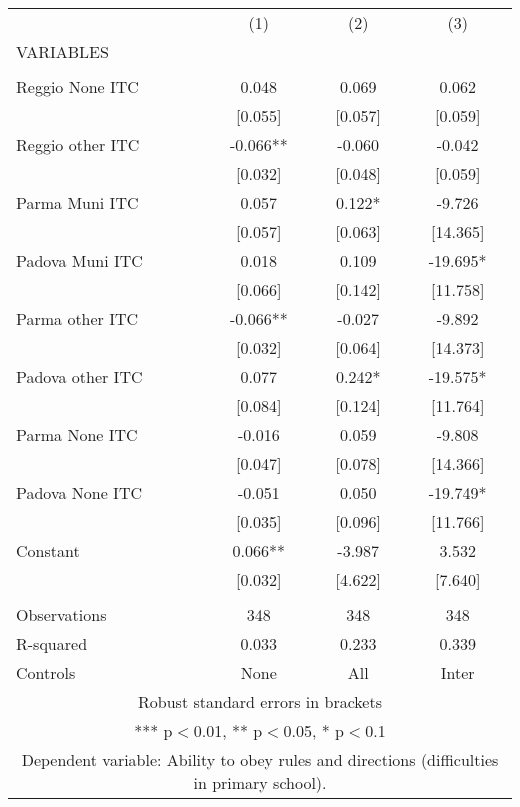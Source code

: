 \begin{tabular}{lccc} \hline
 & (1) & (2) & (3) \\
VARIABLES &  &  &  \\ \hline
 &  &  &  \\
Reggio None ITC & 0.048 & 0.069 & 0.062 \\
 & [0.055] & [0.057] & [0.059] \\
Reggio other ITC & -0.066** & -0.060 & -0.042 \\
 & [0.032] & [0.048] & [0.059] \\
Parma Muni ITC & 0.057 & 0.122* & -9.726 \\
 & [0.057] & [0.063] & [14.365] \\
Padova Muni ITC & 0.018 & 0.109 & -19.695* \\
 & [0.066] & [0.142] & [11.758] \\
Parma other ITC & -0.066** & -0.027 & -9.892 \\
 & [0.032] & [0.064] & [14.373] \\
Padova other ITC & 0.077 & 0.242* & -19.575* \\
 & [0.084] & [0.124] & [11.764] \\
Parma None ITC & -0.016 & 0.059 & -9.808 \\
 & [0.047] & [0.078] & [14.366] \\
Padova None ITC & -0.051 & 0.050 & -19.749* \\
 & [0.035] & [0.096] & [11.766] \\
Constant & 0.066** & -3.987 & 3.532 \\
 & [0.032] & [4.622] & [7.640] \\
 &  &  &  \\
Observations & 348 & 348 & 348 \\
R-squared & 0.033 & 0.233 & 0.339 \\
 Controls & None & All & Inter \\ \hline
\multicolumn{4}{c}{ Robust standard errors in brackets} \\
\multicolumn{4}{c}{ *** p$<$0.01, ** p$<$0.05, * p$<$0.1} \\
\multicolumn{4}{c}{ Dependent variable: Ability to obey rules and directions (difficulties in primary school).} \\
\end{tabular}
